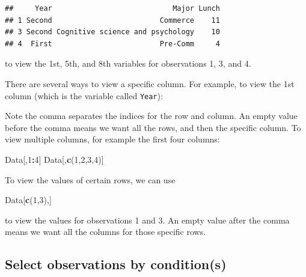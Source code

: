\documentclass[
]{book}
\newenvironment{Shaded}{\begin{snugshade}}{\end{snugshade}}
\newcommand{\DecValTok}[1]{\textcolor[rgb]{0.00,0.00,0.81}{#1}}
\newcommand{\DocumentationTok}[1]{\textcolor[rgb]{0.56,0.35,0.01}{\textbf{\textit{#1}}}}
\newcommand{\FunctionTok}[1]{\textcolor[rgb]{0.13,0.29,0.53}{\textbf{#1}}}
\newcommand{\NormalTok}[1]{#1}
\newcommand{\SpecialCharTok}[1]{\textcolor[rgb]{0.81,0.36,0.00}{\textbf{#1}}}
\begin{document}
\begin{verbatim}
##     Year                            Major Lunch
## 1 Second                         Commerce    11
## 3 Second Cognitive science and psychology    10
## 4  First                         Pre-Comm     4
\end{verbatim}

to view the 1st, 5th, and 8th variables for observations 1, 3, and 4.

There are several ways to view a specific column. For example, to view the 1st column (which is the variable called \texttt{Year}):

\begin{Shaded}
\end{Shaded}

Note the comma separates the indices for the row and column. An empty value before the comma means we want all the rows, and then the specific column. To view multiple columns, for example the first four columns:

\begin{Shaded}
\begin{Highlighting}[]
\NormalTok{Data[,}\DecValTok{1}\SpecialCharTok{:}\DecValTok{4}\NormalTok{]}
\NormalTok{Data[,}\FunctionTok{c}\NormalTok{(}\DecValTok{1}\NormalTok{,}\DecValTok{2}\NormalTok{,}\DecValTok{3}\NormalTok{,}\DecValTok{4}\NormalTok{)]}
\end{Highlighting}
\end{Shaded}

To view the values of certain rows, we can use

\begin{Shaded}
\begin{Highlighting}[]
\NormalTok{Data[}\FunctionTok{c}\NormalTok{(}\DecValTok{1}\NormalTok{,}\DecValTok{3}\NormalTok{),]}
\end{Highlighting}
\end{Shaded}

to view the values for observations 1 and 3. An empty value after the comma means we want all the columns for those specific rows.

\hypertarget{select-observations-by-conditions}{%
\subsection{Select observations by condition(s)}\label{select-observations-by-conditions}}
\end{document}
